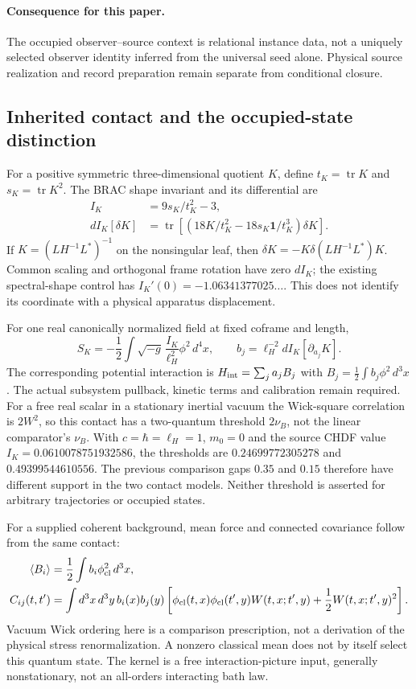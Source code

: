 \documentclass[11pt]{article}
\begin{document}
\paragraph{Consequence for this paper.}
The occupied observer--source context is relational instance data, not a uniquely selected observer identity inferred from the universal seed alone. Physical source realization and record preparation remain separate from conditional closure.

\subsection{Inherited contact and the occupied-state distinction}
For a positive symmetric three-dimensional quotient $K$, define
$t_K=\operatorname{tr}K$ and $s_K=\operatorname{tr}K^2$. The BRAC shape
invariant and its differential are
\begin{align}
 I_K&=9s_K/t_K^2-3,\\
 dI_K[\delta K]&=\operatorname{tr}
 \left[\left(18K/t_K^2-18s_K\mathbf{1}/t_K^3\right)\delta K\right].
\end{align}
If $K=(LH^{-1}L^*)^{-1}$ on the nonsingular leaf, then
$\delta K=-K\delta(LH^{-1}L^*)K$. Common scaling and orthogonal frame
rotation have zero $dI_K$; the existing spectral-shape control has
$I_K'(0)=-1.06341377025\ldots$. This does not identify its coordinate with
a physical apparatus displacement.

For one real canonically normalized field at fixed coframe and length,
\begin{equation}
 S_K=-\frac12\int \sqrt{-g}\,\frac{I_K}{\ell_H^2}\phi^2\,d^4x,
 \qquad b_j=\ell_H^{-2}dI_K[\partial_{a_j}K].
\end{equation}
The corresponding potential interaction is
$H_{\rm int}=\sum_j a_j B_j$ with
$B_j=\frac12\int b_j\phi^2\,d^3x$. The actual subsystem pullback,
kinetic terms and calibration remain required. For a free real scalar in
a stationary inertial vacuum the Wick-square correlation is $2W^2$,
so this contact has a two-quantum threshold $2\nu_B$, not the linear
comparator's $\nu_B$. With $c=\hbar=\ell_H=1$, $m_0=0$ and the
source CHDF value $I_K=0.0610078751932586$, the thresholds are
$0.24699772305278$ and $0.49399544610556$. The previous comparison gaps
$0.35$ and $0.15$ therefore have different support in the two contact models.
Neither threshold is asserted for arbitrary trajectories or occupied states.

For a supplied coherent background, mean force and connected covariance
follow from the same contact:
\begin{align}
 \langle B_i\rangle&=\frac12\int b_i\phi_{\rm cl}^2\,d^3x,\\
 C_{ij}(t,t')&=\int d^3x\,d^3y\,b_i(x)b_j(y)
 \left[\phi_{\rm cl}(t,x)\phi_{\rm cl}(t',y)W(t,x;t',y)
 +\frac12 W(t,x;t',y)^2\right].
\end{align}
Vacuum Wick ordering here is a comparison prescription, not a derivation
of the physical stress renormalization. A nonzero classical mean does not
by itself select this quantum state. The kernel is a free interaction-picture
input, generally nonstationary, not an all-orders interacting bath law.
\end{document}
